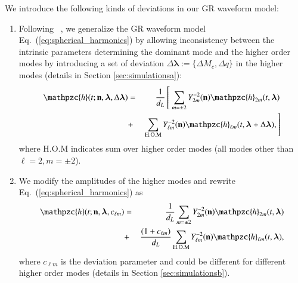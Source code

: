 \documentclass[prd,preprintnumbers,twocolumn,eqsecnum,floatfix,a4paper,nofootinbib,superscriptaddress]{revtex4}
\newcommand{\h}{\mathpzc{h}}
\newcommand{\hlm}{\mathpzc{h}_{\ell m}}
\newcommand{\Ylm}{{Y}^{-2}_{\ell m}}
\newcommand{\blambda}{\bm{\lambda}}
\newcommand{\n}{\mathbf{n}}
\begin{document}

We introduce the following kinds of deviations in our GR waveform model: 

\begin{enumerate}
	\item Following ~\cite{dhanpal2018}, we generalize the GR waveform model Eq.~(\ref{eq:spherical_harmonics}) by allowing inconsistency between the intrinsic parameters determining the dominant mode and the higher order modes by introducing a set of deviation $\Delta \blambda := \{\Delta M_c, \Delta q\}$ in the higher modes (details in Section \ref{sec:simulationsa}):
	\begin{eqnarray}
	\h(t; \n, \blambda, \Delta \blambda) & = &  \frac{1}{d_L} \left[ ~ \sum_{m = \pm2} Y^{-2}_{2m} (\n) {\h}_{2m}(t, \blambda) \right. \nonumber \\ 
	& + & \left. \sum _{\text{H.O.M}} \Ylm (\n) \hlm(t, \blambda+\Delta \blambda), \right]
	\label{eq:test_1}
	\end{eqnarray}
where {H.O.M} indicates sum over higher order modes (all modes other than $\ell = 2, m = \pm 2$). 
	
	\item We modify the amplitudes of the higher modes and rewrite Eq.~(\ref{eq:spherical_harmonics}) as
	\begin{eqnarray}
	{\h}(t; \n, \blambda, c_{\ell m}) & = & \frac{1}{d_L} \sum_{m = \pm2} Y^{-2}_{2m} (\n) {\h}_{2m}(t, \blambda)  \nonumber \\ 
	& + & \frac{(1+{c_{\ell m}})}{d_L} \sum _{\text{H.O.M}} \Ylm (\n) \hlm(t, \blambda),
	\label{eq:test_2}
	\end{eqnarray}
	where $c_{\ell m}$ is the deviation parameter and could be different for different higher order modes (details in Section \ref{sec:simulationsb}). 
	

\end{enumerate}
\end{document}
